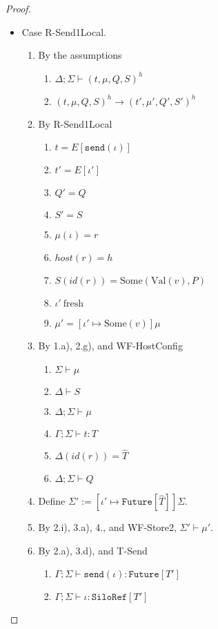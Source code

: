 \documentclass{article}
\theoremstyle{definition}
\newcommand{\Val}[1]{\text{Val}(#1)}
\begin{document}
\begin{proof}
\begin{itemize}
\item Case R-Send1Local.
\begin{enumerate}
\item By the assumptions
  \begin{enumerate}[label=(\alph*)]
  \item $\Delta ; \Sigma \vdash (t, \mu, Q, S)^h$
  \item $(t, \mu, Q, S)^h \longrightarrow (t', \mu', Q', S')^h$
  \end{enumerate}
\item By R-Send1Local
  \begin{enumerate}[label=(\alph*)]
  \item $t = E[\texttt{send}(\iota)]$
  \item $t' = E[\iota']$
  \item $Q' = Q$
  \item $S' = S$
  \item $\mu(\iota) = r$
  \item $host(r) = h$
  \item $S(id(r)) = \text{Some}({\Val v}, P)$
  \item $\iota'~\text{fresh}$
  \item $\mu' = [\iota' \mapsto \text{Some}(v)]\mu$  %
  \end{enumerate}
\item By 1.a), 2.g), and WF-HostConfig
  \begin{enumerate}[label=(\alph*)]
  \item $\Sigma \vdash \mu$
  \item $\Delta \vdash S$
  \item $\Delta ; \Sigma \vdash \mu$
  \item $\Gamma ; \Sigma \vdash t : T$
  \item $\Delta(id(r)) = \hat{T}$
  \item $\Delta ; \Sigma \vdash Q$
  \end{enumerate}
\item Define $\Sigma' := [\iota' \mapsto \texttt{Future}[\hat{T}]]\Sigma$.
\item By 2.i), 3.a), 4., and WF-Store2, $\Sigma' \vdash \mu'$.
\item By 2.a), 3.d), and T-Send
  \begin{enumerate}[label=(\alph*)]
  \item $\Gamma ; \Sigma \vdash \texttt{send}(\iota) : \texttt{Future}[T']$
  \item $\Gamma ; \Sigma \vdash \iota : \texttt{SiloRef}[T']$

\end{enumerate}
\end{enumerate}
\end{itemize}
\end{proof}
\end{document}
